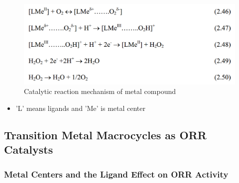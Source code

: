 \documentclass{beamer}
\begin{document}
\begin{frame}
\begin{figure}[htbp]
    \begin{center}
    \includegraphics[scale=0.65]{image1}
    \caption{Catalytic reaction mechanism of metal compound}
    \end{center}
\end{figure}
\begin{itemize}
\item{'L' means ligands and 'Me' is metal center}
\end{itemize}
\end{frame}


\subsection{Transition Metal Macrocycles as ORR Catalysts}
\subsubsection{Metal Centers and the Ligand Effect on ORR Activity}
\end{document}
